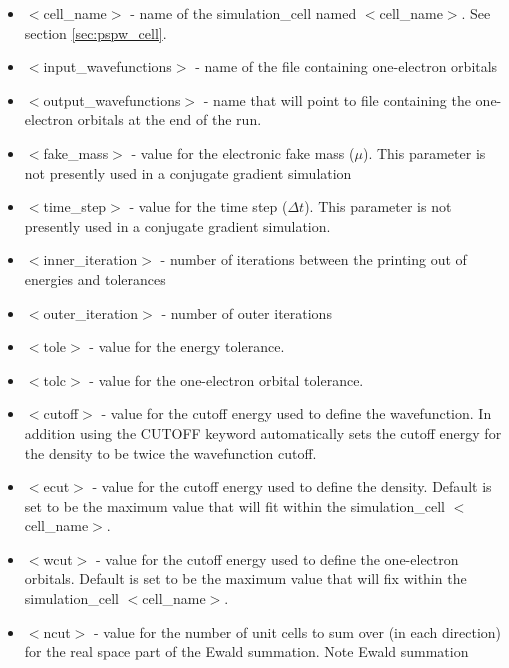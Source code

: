 \begin{itemize}
        \item $<$cell\_name$>$ - name of
              the simulation\_cell named $<$cell\_name$>$.  See section \ref{sec:pspw_cell}.
        \item $<$input\_wavefunctions$>$ - name of the
              file containing one-electron orbitals
        \item $<$output\_wavefunctions$>$ - name that will
              point to file containing the one-electron orbitals at the
              end of the run. 
        \item $<$fake\_mass$>$ - value for the electronic
              fake mass ($\mu$). This parameter is not presently used in a 
              conjugate gradient simulation
        \item $<$time\_step$>$ - value for the time step ($\Delta t$).  This
              parameter is not presently used in a conjugate gradient simulation.
        \item $<$inner\_iteration$>$ - number of iterations between the 
              printing out of energies and tolerances
        \item $<$outer\_iteration$>$ - number of outer iterations
        \item $<$tole$>$ - value for the energy tolerance.
        \item $<$tolc$>$ - value for the one-electron orbital tolerance.
        \item $<$cutoff$>$ - value for the cutoff energy used to define the wavefunction.  In addition
                             using the CUTOFF keyword automatically sets the cutoff energy for the density
                             to be twice the wavefunction cutoff.
        \item $<$ecut$>$ - value for the cutoff energy used
                           to define the density. Default is set
                           to be the maximum value that will fit
                            within the simulation\_cell $<$cell\_name$>$.
        \item $<$wcut$>$ - value for the cutoff energy used
                           to define the one-electron orbitals.
                           Default is set to be the maximum value that 
                           will fix within the simulation\_cell $<$cell\_name$>$.
        \item $<$ncut$>$ - value for the number of unit cells
                          to sum over (in each direction) for the real space
                          part of the Ewald summation. Note Ewald summation

\end{itemize}
